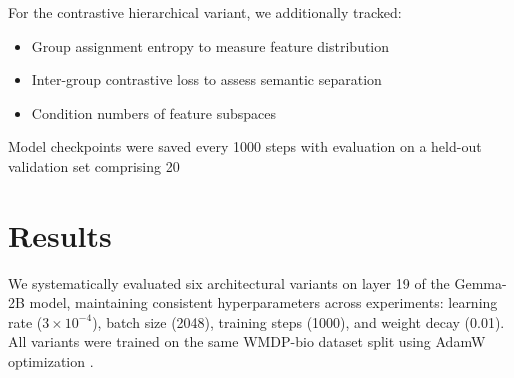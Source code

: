 \documentclass{article} %
\begin{document}
For the contrastive hierarchical variant, we additionally tracked:
\begin{itemize}
    \item Group assignment entropy to measure feature distribution
    \item Inter-group contrastive loss to assess semantic separation
    \item Condition numbers of feature subspaces
\end{itemize}

Model checkpoints were saved every 1000 steps with evaluation on a held-out validation set comprising 20%

\section{Results}
\label{sec:results}

We systematically evaluated six architectural variants on layer 19 of the Gemma-2B model, maintaining consistent hyperparameters across experiments: learning rate ($3\times10^{-4}$), batch size (2048), training steps (1000), and weight decay (0.01). All variants were trained on the same WMDP-bio dataset split using AdamW optimization \cite{loshchilov2017adamw}.
\end{document}
